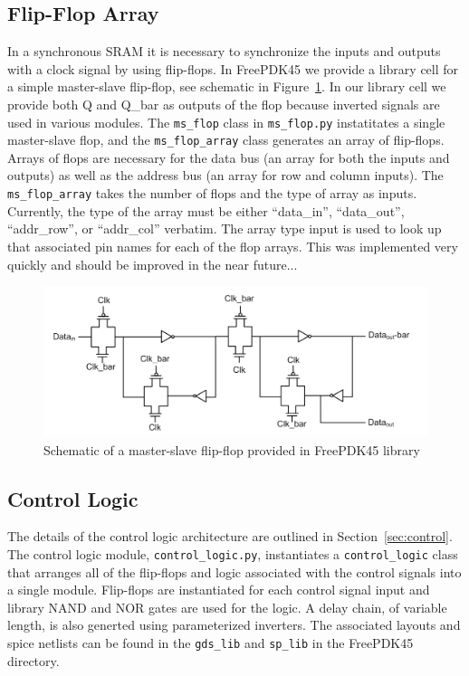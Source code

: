\subsection{Flip-Flop Array}

In a synchronous SRAM it is necessary to synchronize the inputs and
outputs with a clock signal by using flip-flops.  In FreePDK45 we
provide a library cell for a simple master-slave flip-flop, see
schematic in Figure~\ref{fig:ms_flop}.  In our library cell we provide
both Q and Q\_bar as outputs of the flop because inverted signals are
used in various modules.  The \verb|ms_flop| class in \verb|ms_flop.py|
instatitates a single master-slave flop, and the \verb|ms_flop_array| class
generates an array of flip-flops.  Arrays of flops are necessary for
the data bus (an array for both the inputs and outputs) as well as the
address bus (an array for row and column inputs).  The \verb|ms_flop_array|
takes the number of flops and the type of array as inputs.  Currently,
the type of the array must be either ``data\_in'', ``data\_out'',
``addr\_row'', or ``addr\_col'' verbatim.  The array type input is
used to look up that associated pin names for each of the flop arrays.
This was implemented very quickly and should be improved in the near
future...

\begin{figure}[h!]
\centering
\includegraphics[scale=.7]{./figs/ms_flop_schem.pdf}
\caption{Schematic of a master-slave flip-flop provided in FreePDK45 library}
\label{fig:ms_flop}
\end{figure}

\subsection{Control Logic}

The details of the control logic architecture are outlined in
Section~\ref{sec:control}.  The control logic module,
\verb|control_logic.py|, instantiates a \verb|control_logic| class that arranges
all of the flip-flops and logic associated with the control signals
into a single module. Flip-flops are instantiated for each control
signal input and library NAND and NOR gates are used for the logic.  A
delay chain, of variable length, is also generted using parameterized
inverters.  The associated layouts and spice netlists can be found in
the \verb|gds_lib| and \verb|sp_lib| in the FreePDK45 directory.

